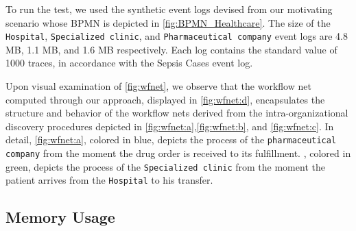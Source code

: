 To run the test, we used the synthetic event logs devised from our motivating scenario whose BPMN is depicted in \cref{fig:BPMN_Healthcare}. The size of the \texttt{Hospital}, \texttt{Specialized clinic}, and \texttt{Pharmaceutical company} event logs are 4.8 MB, 1.1 MB, and 1.6 MB respectively.  Each log contains the standard value of 1000 traces, in accordance with the Sepsis Cases \cite{sepsis} event log. %

Upon visual examination of \cref{fig:wfnet}, we observe that the workflow net computed through our approach, displayed in \cref{fig:wfnet:d}, encapsulates the structure and behavior of the workflow nets derived from the intra-organizational discovery procedures depicted in \cref{fig:wfnet:a},\cref{fig:wfnet:b}, and \cref{fig:wfnet:c}. %
In detail, \cref{fig:wfnet:a}, colored in blue, depicts the process of the \texttt{pharmaceutical company} from the moment the drug order is received to its fulfillment. , colored in green, depicts the process of the \texttt{Specialized clinic} from the moment the patient arrives from the \texttt{Hospital} to his transfer.



\subsection{Memory Usage}
\label{sec:discussion:subsec:memory}

